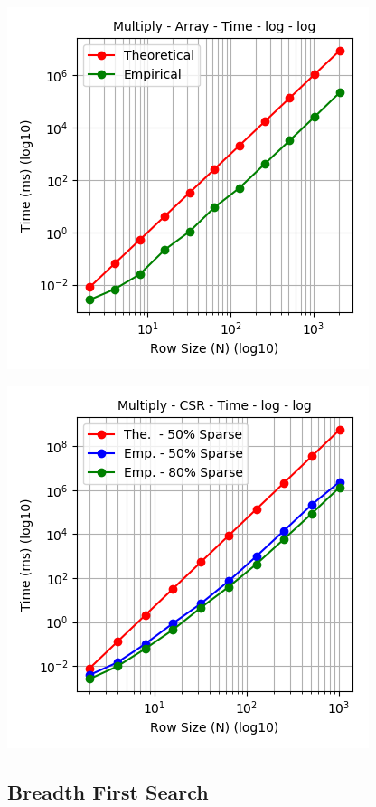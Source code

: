 \documentclass[11pt,a4paper,oneside]{article}
\begin{document}
     \begin{center}
    	\includegraphics[scale=0.6]{5.png}		
    \end{center}
    
    \begin{center}
    	\includegraphics[scale=0.6]{6.png}		
    \end{center}

    \subsection{Breadth First Search}
    
\end{document}
